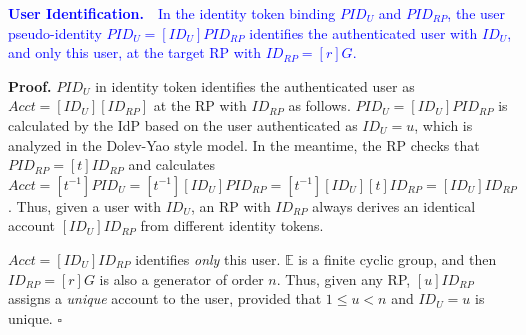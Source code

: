 \vspace{1mm}
\noindent\textcolor{blue}{\textbf{User Identification.}~~In the identity token
    binding $PID_U$ and $PID_{RP}$,
the user pseudo-identity $PID_U = [ID_U]PID_{RP}$ identifies
        the authenticated user with $ID_U$, %
         and only this user,  at the target RP with $ID_{RP} = [r]G$.}

\vspace{0.75mm}
\noindent\textbf{Proof.}
$PID_U$ in identity token identifies the authenticated user as $Acct = [ID_U][ID_{RP}]$
    at the RP with $ID_{RP}$ as follows.
$PID_U = [ID_U]PID_{RP}$ is calculated by the IdP based on the user authenticated as $ID_U = u$, 
    which is analyzed in the Dolev-Yao style model.
In the meantime, the  RP checks that $PID_{RP} = [t]ID_{RP}$
    and calculates $Acct = [t^{-1}]PID_U = [t^{-1}][ID_U]PID_{RP} = [t^{-1}][ID_U][t]ID_{RP} = [ID_U]ID_{RP}$.
Thus, given a user with $ID_U$, an RP with $ID_{RP}$ always derives an identical account
 $[ID_U]ID_{RP}$ from different identity tokens. %

$Acct =  [ID_U]ID_{RP}$ identifies \emph{only} this user.
$\mathbb{E}$ is a finite cyclic group,
    and then $ID_{RP} = [r]G$ is also a generator of order $n$.
Thus, given any RP,
    $[u]ID_{RP}$ assigns a \emph{unique} account to the user,
        provided that $1 \leq u < n$ and $ID_U = u$ is unique. $\square$





